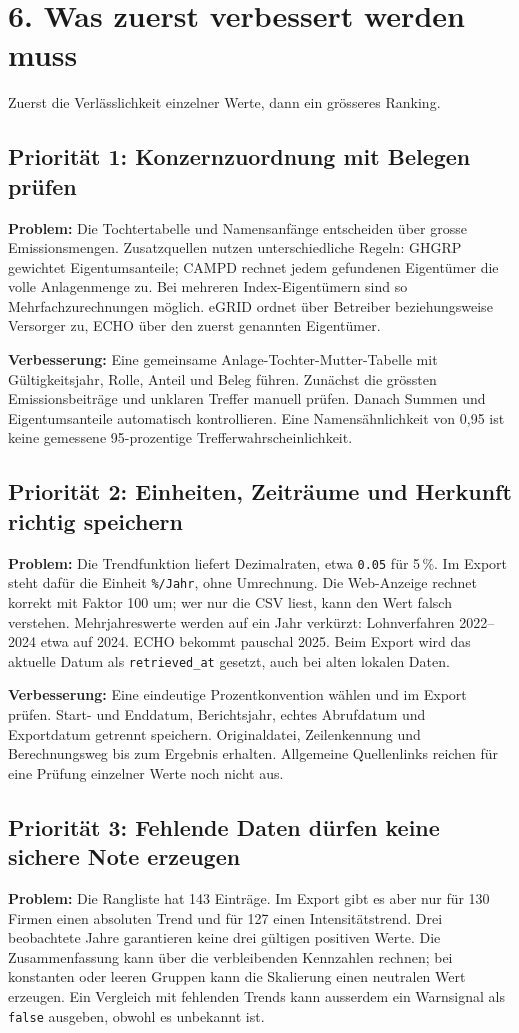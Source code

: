 \documentclass[11pt,a4paper]{article}
\newcommand{\lead}[1]{{\large\sffamily\color{accent}#1}\par}
\newcommand{\page}[2]{\clearpage\section*{#1}\lead{#2}}
\begin{document}
\page{6. Was zuerst verbessert werden muss}{Zuerst die Verlässlichkeit einzelner Werte, dann ein grösseres Ranking.}
\subsection*{Priorität 1: Konzernzuordnung mit Belegen prüfen}
\textbf{Problem:} Die Tochtertabelle und Namensanfänge entscheiden über grosse Emissionsmengen. Zusatzquellen nutzen unterschiedliche Regeln: GHGRP gewichtet Eigentumsanteile; CAMPD rechnet jedem gefundenen Eigentümer die volle Anlagenmenge zu. Bei mehreren Index-Eigentümern sind so Mehrfachzurechnungen möglich. eGRID ordnet über Betreiber beziehungsweise Versorger zu, ECHO über den zuerst genannten Eigentümer.

\textbf{Verbesserung:} Eine gemeinsame Anlage-Tochter-Mutter-Tabelle mit Gültigkeitsjahr, Rolle, Anteil und Beleg führen. Zunächst die grössten Emissionsbeiträge und unklaren Treffer manuell prüfen. Danach Summen und Eigentumsanteile automatisch kontrollieren. Eine Namensähnlichkeit von 0,95 ist keine gemessene 95-prozentige Trefferwahrscheinlichkeit.

\subsection*{Priorität 2: Einheiten, Zeiträume und Herkunft richtig speichern}
\textbf{Problem:} Die Trendfunktion liefert Dezimalraten, etwa \texttt{0.05} für 5\,\%. Im Export steht dafür die Einheit \texttt{\%/Jahr}, ohne Umrechnung. Die Web-Anzeige rechnet korrekt mit Faktor 100 um; wer nur die CSV liest, kann den Wert falsch verstehen. Mehrjahreswerte werden auf ein Jahr verkürzt: Lohnverfahren 2022--2024 etwa auf 2024. ECHO bekommt pauschal 2025. Beim Export wird das aktuelle Datum als \texttt{retrieved\_at} gesetzt, auch bei alten lokalen Daten.

\textbf{Verbesserung:} Eine eindeutige Prozentkonvention wählen und im Export prüfen. Start- und Enddatum, Berichtsjahr, echtes Abrufdatum und Exportdatum getrennt speichern. Originaldatei, Zeilenkennung und Berechnungsweg bis zum Ergebnis erhalten. Allgemeine Quellenlinks reichen für eine Prüfung einzelner Werte noch nicht aus.

\subsection*{Priorität 3: Fehlende Daten dürfen keine sichere Note erzeugen}
\textbf{Problem:} Die Rangliste hat 143 Einträge. Im Export gibt es aber nur für 130 Firmen einen absoluten Trend und für 127 einen Intensitätstrend. Drei beobachtete Jahre garantieren keine drei gültigen positiven Werte. Die Zusammenfassung kann über die verbleibenden Kennzahlen rechnen; bei konstanten oder leeren Gruppen kann die Skalierung einen neutralen Wert erzeugen. Ein Vergleich mit fehlenden Trends kann ausserdem ein Warnsignal als \texttt{false} ausgeben, obwohl es unbekannt ist.
\end{document}
